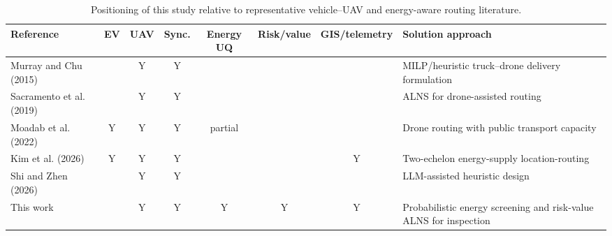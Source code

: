\begin{table}[t]
\centering
\caption{Positioning of this study relative to representative vehicle--UAV and energy-aware routing literature.}
\label{tab:literature-position}
\footnotesize
\begin{tabularx}{\textwidth}{@{}lccccccX@{}}
\toprule
Reference & EV & UAV & Sync. & Energy UQ & Risk/value & GIS/telemetry & Solution approach \\
\midrule
Murray and Chu (2015) &  & Y & Y &  &  &  & MILP/heuristic truck--drone delivery formulation \\
Sacramento et al. (2019) &  & Y & Y &  &  &  & ALNS for drone-assisted routing \\
Moadab et al. (2022) & Y & Y & Y & partial &  &  & Drone routing with public transport capacity \\
Kim et al. (2026) & Y & Y & Y &  &  & Y & Two-echelon energy-supply location-routing \\
Shi and Zhen (2026) &  & Y & Y &  &  &  & LLM-assisted heuristic design \\
This work &  & Y & Y & Y & Y & Y & Probabilistic energy screening and risk-value ALNS for inspection \\
\bottomrule
\end{tabularx}
\end{table}

